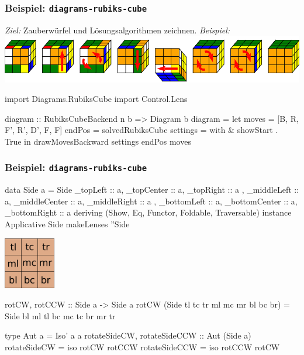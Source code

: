 \documentclass{beamer}
\begin{document}
\begin{frame}[fragile]
  \frametitle{Beispiel: \texttt{diagrams-rubiks-cube}}
  \emph{Ziel:} Zauberwürfel und Lösungsalgorithmen zeichnen. \emph{Beispiel:}\\[1em]
  \includegraphics[width=0.65\linewidth]{images/rubiks-sequence.png}\\
  \begin{haskellcode}
import Diagrams.RubiksCube
import Control.Lens

diagram :: RubiksCubeBackend n b => Diagram b
diagram =
  let moves    = [B, R, F', R', D', F, F]
      endPos   = solvedRubiksCube
      settings = with & showStart .~ True
  in drawMovesBackward settings endPos moves
  \end{haskellcode}
\end{frame}

\begin{frame}[fragile]
  \frametitle{Beispiel: \texttt{diagrams-rubiks-cube}}

  \begin{haskellcode}
data Side a = Side
  {    _topLeft :: a,    _topCenter :: a,    _topRight :: a
  , _middleLeft :: a, _middleCenter :: a, _middleRight :: a
  , _bottomLeft :: a, _bottomCenter :: a, _bottomRight :: a
  } deriving (Show, Eq, Functor, Foldable, Traversable)
instance Applicative Side
makeLenses ''Side
  \end{haskellcode}
  \vspace{0.5em}
  \begin{minipage}{0.22 \linewidth}
    \includegraphics[width=2.25cm]{images/side.png}
  \end{minipage}
  \begin{minipage}{0.75 \linewidth}
    \begin{haskellcode}
rotCW, rotCCW :: Side a -> Side a
rotCW (Side tl tc tr ml mc mr bl bc br) =
       Side bl ml tl bc mc tc br mr tr

type Aut a = Iso' a a
rotateSideCW, rotateSideCCW :: Aut (Side a)
rotateSideCW  = iso rotCW  rotCCW
rotateSideCCW = iso rotCCW rotCW
    \end{haskellcode}
  \end{minipage}
\end{frame}
\end{document}
